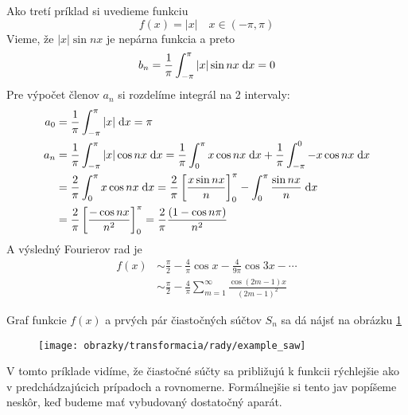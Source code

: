 
\begin{priklad}
    Ako tretí príklad si uvedieme funkciu
    \begin{equation}
        f(x) = |x| \quad x\in(-\pi,\pi)
    \end{equation}
    Vieme, že $|x| \sin nx$ je nepárna funkcia a preto
    \begin{equation}
        b_n = \frac{1}{\pi} \int_{-\pi}^{\pi} |x| \sin nx \; \mathrm{d} x = 0
    \end{equation}
    Pre výpočet členov $a_n$ si rozdelíme integrál na 2 intervaly:
    \begin{equation}
    \begin{split}
        a_0 &= \frac{1}{\pi} \int_{-\pi}^{\pi} |x| \; \mathrm{d} x = \pi \\
        a_n &= \frac{1}{\pi} \int_{-\pi}^{\pi} |x| \cos nx \; \mathrm{d} x 
            = \frac{1}{\pi} \int_0^{\pi} x \cos nx \; \mathrm{d} x +
                \frac{1}{\pi} \int_{-\pi}^0 -x \cos nx \; \mathrm{d} x \\
            &= \frac{2}{\pi} \int_0^{\pi} x \cos nx \; \mathrm{d} x 
             = \frac{2}{\pi} \left[
                \frac{x \sin nx}{n}
                \right]_0^{\pi} -
                \int_0^{\pi} \frac{\sin nx}{n} \; \mathrm{d} x \\
            &= \frac{2}{\pi} \left[
                    \frac{-\cos nx}{n^2} \right]_0^\pi 
            = \frac{2}{\pi} \frac{(1-\cos n\pi)}{n^2}
    \end{split}
    \end{equation}
    A výsledný Fourierov rad je
    \begin{equation}
    \begin{split}
        f(x) &\sim \frac{\pi}{2} - \frac{4}{\pi} \cos x -
            \frac{4}{9\pi} \cos 3x - \cdots \\
            &\sim \frac{\pi}{2} - \frac{4}{\pi}
                \sum_{m=1}^{\infty} \frac{\cos(2m-1) x}{(2m-1)^2}            
    \end{split}
    \end{equation}
    
    Graf funkcie $f(x)$ a prvých pár čiastočných súčtov $S_n$ sa dá
    nájsť na obrázku \ref{fig:example_saw}

    \begin{figure}[htp]
        \centering
        \texttt{[image: obrazky/transformacia/rady/example\_saw]}
        \caption{}
        \label{fig:example_saw}
    \end{figure}    
 V tomto príklade vidíme, že čiastočné súčty sa približujú k funkcii
 rýchlejšie ako v predchádzajúcich prípadoch a rovnomerne.
 Formálnejšie si tento jav popíšeme neskôr, keď budeme mať vybudovaný
 dostatočný aparát.
\end{priklad}
